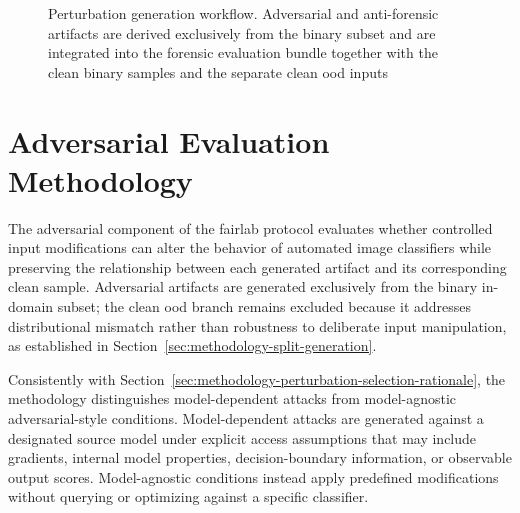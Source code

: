 \begin{figure}[H]
{%
}
\caption[Perturbation generation workflow]{Perturbation generation workflow.
Adversarial and anti-forensic artifacts are derived exclusively from the binary
subset and are integrated into the forensic evaluation bundle together with the
clean binary samples and the separate clean \gls{ood} inputs}
\label{fig:methodology-perturbation-workflow}
\end{figure}

\section{Adversarial Evaluation Methodology}
\label{sec:methodology-adversarial-attacks}

The adversarial component of the \gls{fairlab} protocol evaluates whether
controlled input modifications can alter the behavior of automated image
classifiers while preserving the relationship between each generated artifact
and its corresponding clean sample. Adversarial artifacts are generated
exclusively from the binary in-domain subset; the clean \gls{ood} branch
remains excluded because it addresses distributional mismatch rather than
robustness to deliberate input manipulation, as established in
Section~\ref{sec:methodology-split-generation}.

Consistently with
Section~\ref{sec:methodology-perturbation-selection-rationale}, the methodology
distinguishes model-dependent attacks from model-agnostic adversarial-style
conditions. Model-dependent attacks are generated against a designated source
model under explicit access assumptions that may include gradients, internal
model properties, decision-boundary information, or observable output scores.
Model-agnostic conditions instead apply predefined modifications without
querying or optimizing against a specific classifier.

